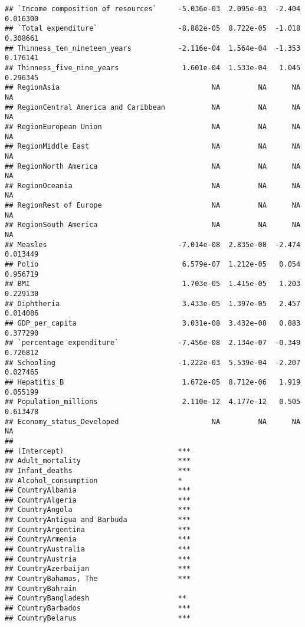 \documentclass[
]{article}
\begin{document}
\begin{verbatim}
## `Income composition of resources`     -5.036e-03  2.095e-03  -2.404 0.016300
## `Total expenditure`                   -8.882e-05  8.722e-05  -1.018 0.308661
## Thinness_ten_nineteen_years           -2.116e-04  1.564e-04  -1.353 0.176141
## Thinness_five_nine_years               1.601e-04  1.533e-04   1.045 0.296345
## RegionAsia                                    NA         NA      NA       NA
## RegionCentral America and Caribbean           NA         NA      NA       NA
## RegionEuropean Union                          NA         NA      NA       NA
## RegionMiddle East                             NA         NA      NA       NA
## RegionNorth America                           NA         NA      NA       NA
## RegionOceania                                 NA         NA      NA       NA
## RegionRest of Europe                          NA         NA      NA       NA
## RegionSouth America                           NA         NA      NA       NA
## Measles                               -7.014e-08  2.835e-08  -2.474 0.013449
## Polio                                  6.579e-07  1.212e-05   0.054 0.956719
## BMI                                    1.703e-05  1.415e-05   1.203 0.229130
## Diphtheria                             3.433e-05  1.397e-05   2.457 0.014086
## GDP_per_capita                         3.031e-08  3.432e-08   0.883 0.377290
## `percentage expenditure`              -7.456e-08  2.134e-07  -0.349 0.726812
## Schooling                             -1.222e-03  5.539e-04  -2.207 0.027465
## Hepatitis_B                            1.672e-05  8.712e-06   1.919 0.055199
## Population_millions                    2.110e-12  4.177e-12   0.505 0.613478
## Economy_status_Developed                      NA         NA      NA       NA
##                                          
## (Intercept)                           ***
## Adult_mortality                       ***
## Infant_deaths                         ***
## Alcohol_consumption                   *  
## CountryAlbania                        ***
## CountryAlgeria                        ***
## CountryAngola                         ***
## CountryAntigua and Barbuda            ***
## CountryArgentina                      ***
## CountryArmenia                        ***
## CountryAustralia                      ***
## CountryAustria                        ***
## CountryAzerbaijan                     ***
## CountryBahamas, The                   ***
## CountryBahrain                           
## CountryBangladesh                     ** 
## CountryBarbados                       ***
## CountryBelarus                        ***

\end{verbatim}
\end{document}
